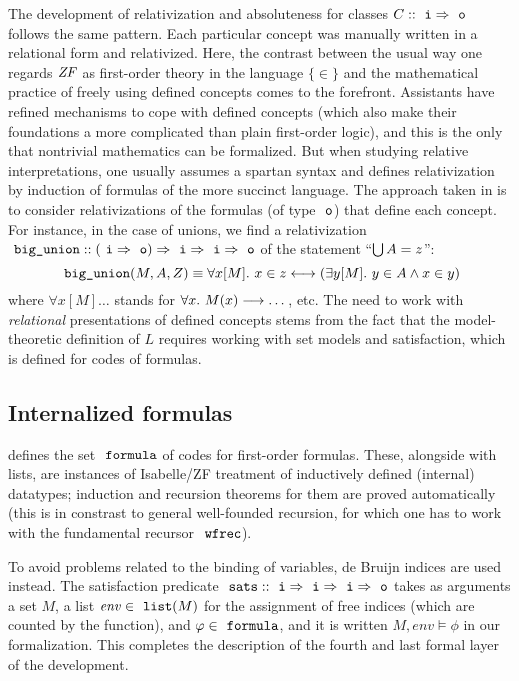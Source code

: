 The development of relativization and absoluteness for classes $C::
\isatt{i} \fun \isatt{o}$ follows the same pattern. Each particular
concept was manually written in a relational form and relativized.
Here, the contrast between the usual way one regards $\mathit{ZF}$ as
first-order theory in the language $\{\in \}$ and the mathematical
practice of freely using defined concepts comes to the
forefront. Assistants have refined mechanisms to cope with defined
concepts (which also make their foundations a more complicated
than plain first-order logic), and this is the only that  nontrivial
mathematics can be formalized. But when studying relative interpretations, one
usually assumes a spartan syntax and defines relativization by
induction of formulas of the more succinct language. The approach
taken in  is to consider relativizations of
the formulas (of type $\tyo$) that define each concept. For instance,
in the case of unions, we find a relativization
$\isatt{big{\uscore}union}:: (\isatt{i} \fun \isatt{o}) \fun \isatt{i}
\fun \isatt{i} \fun \isatt{o}$ of the statement
“$\mathop{\textstyle\bigcup} A = z$”:
\[
 \isatt{big{\uscore}union}(M,A,Z) \equiv \forall x[M].\ x \in z
 \longleftrightarrow (\exists y[M].\ y \in A \land x \in y)
\]
where $\forall x[M]\dots$ stands for $\forall x.\ M(x)\longrightarrow \dots$,
etc. The need to work with \emph{relational} presentations of defined
concepts stems from the fact that the model-theoretic definition of
$L$ requires working with set models and satisfaction, which is
defined for codes of formulas.

\subsection{Internalized formulas}
\label{sec:internalized-formulas}

 defines the set $\formula$ of codes for
first-order formulas. These, alongside with lists, are instances of
Isabelle/ZF treatment of inductively defined (internal) datatypes; induction
and recursion theorems for them are proved automatically (this is in
constrast to general well-founded recursion, for which one has to work
with the fundamental recursor $\isatt{wfrec}$).

To avoid problems related to the binding of variables, de Bruijn
indices \cite{MR0321704} are used instead. The satisfaction predicate
$\isatt{sats}::\tyi\fun\tyi\fun\tyi\fun\tyo$ takes as arguments a set $M$, a list
$\mathit{env}\in\isatt{list}(M)$ for the assignment of free indices
(which are counted by the  function),
and $\phi\in\formula$, and it is written
$M,\mathit{env}\models\phi$ in our formalization. This completes the
description of the fourth and last formal layer of the development.

